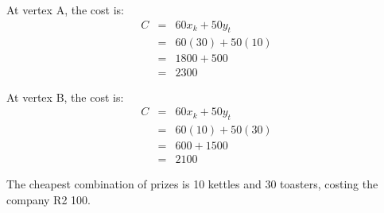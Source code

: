 \begin{wex}
{
At vertex A, the cost is:
\begin{eqnarray*}
C&=&60x_k+50y_t\\
&=&60(30)+50(10)\\
&=&1800+500\\
&=&2300
\end{eqnarray*}

At vertex B, the cost is:
\begin{eqnarray*}
C&=&60x_k+50y_t\\
&=&60(10)+50(30)\\
&=&600+1500\\
&=&2100
\end{eqnarray*}

The cheapest combination of prizes is 10 kettles and 30 toasters, costing the company R2 100.
}
\end{wex}

